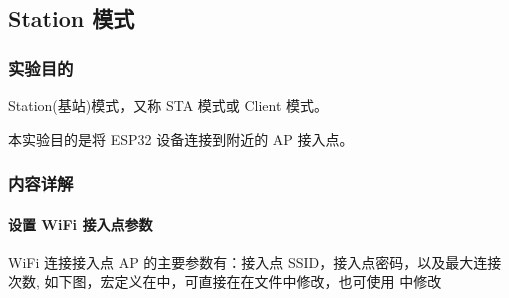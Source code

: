 \documentclass[a4paper,12pt,english]{sphinxmanual}
\begin{document}
{{\sphinxstepscope


\subsection{Station 模式}
\label{\detokenize{exp-esp32/wifi/station:station}}\label{\detokenize{exp-esp32/wifi/station::doc}}

\subsubsection{实验目的}
\label{\detokenize{exp-esp32/wifi/station:id1}}
\sphinxAtStartPar
Station(基站)模式，又称 STA 模式或 Client 模式。

\sphinxAtStartPar
本实验目的是将 ESP32 设备连接到附近的 AP 接入点。


\subsubsection{内容详解}
\label{\detokenize{exp-esp32/wifi/station:id2}}

\paragraph{设置 WiFi 接入点参数}
\label{\detokenize{exp-esp32/wifi/station:wifi}}
\sphinxAtStartPar
WiFi 连接接入点 AP 的主要参数有：接入点 SSID，接入点密码，以及最大连接次数, 如下图，宏定义在中，可直接在在文件中修改，也可使用 中修改

\begin{sphinxVerbatim}[commandchars=\\\{\}]
\end{sphinxVerbatim}

}}
\end{document}
